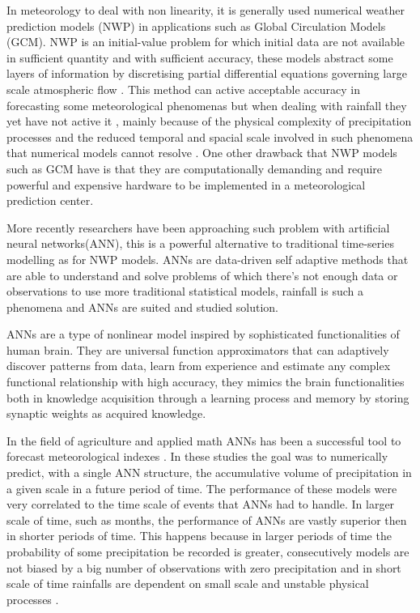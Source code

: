 In meteorology to deal with non linearity, it is generally used numerical weather prediction models (NWP) in applications such as Global Circulation Models (GCM). NWP is an initial-value problem for which initial data are not available in sufficient quantity and with sufficient accuracy, these models abstract some layers of information by discretising partial differential equations governing large scale atmospheric flow \cite{ghil1981applications}. This method can active acceptable accuracy in forecasting some meteorological phenomenas but when dealing with rainfall they yet have not active it \cite{ramirez2006linear}, mainly because of the physical complexity of precipitation processes and the reduced temporal and spacial scale involved in such phenomena that numerical models cannot resolve \cite{kuligowski1998localized}. One other drawback that NWP models such as GCM have is that they are computationally demanding and require powerful and expensive hardware to be implemented in a meteorological prediction center.

More recently researchers have been approaching such problem with artificial neural networks(ANN), this is a powerful alternative to traditional time-series modelling \cite{zhang1998linear} as for NWP models. ANNs are data-driven self adaptive methods that are able to understand and solve problems of which there's not enough data or observations to use more traditional statistical models\cite{zhang1998forecasting}, rainfall is such a phenomena and ANNs are suited and studied solution.

ANNs are a type of nonlinear model inspired by sophisticated functionalities of human brain. They are universal function approximators that can adaptively discover patterns from data, learn from experience and estimate any complex functional relationship with high accuracy\cite{zhang1998linear, wang2003artificial}, they mimics the brain functionalities both in knowledge acquisition through a learning process and memory by storing synaptic weights as acquired knowledge\cite{ferraudo}.

In the field of agriculture and applied math ANNs has been a successful tool to forecast meteorological indexes  \cite{kumarasiri2006rainfall, nasseri2008optimized, ramirez2006linear, luk2000study, french1992rainfall, toth2000comparison, partal2015daily}. In these studies the goal was to numerically predict, with a single ANN structure, the accumulative volume of precipitation in a given scale in a future period of time. The performance of these models were very correlated to the time scale of events that ANNs had to handle. In larger scale of time, such as months, the performance of ANNs are vastly superior then in shorter periods of time. This happens because in larger periods of time the probability of some precipitation be recorded is greater, consecutively models are not biased by a big number of observations with zero precipitation \cite{schoof2001downscaling} and in short scale of time rainfalls are dependent on small scale and unstable physical processes \cite{kuligowski1998localized}.

